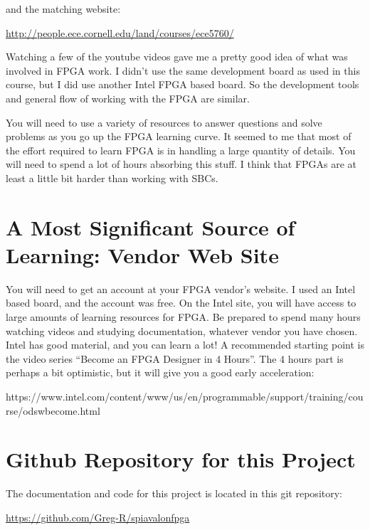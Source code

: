and the matching website:

\url{http://people.ece.cornell.edu/land/courses/ece5760/}

Watching a few of the youtube videos gave me a pretty good idea of what was involved in FPGA work.
I didn't use the same development board as used in this course, but I did use
another Intel FPGA based board.  So the development tools and general flow of working
with the FPGA are similar.

You will need to use a variety of resources to answer questions and solve problems as you go up the FPGA learning curve.
It seemed to me that most of the effort required to learn FPGA is in handling a large quantity of details.
You will need to spend a lot of hours absorbing this stuff.  I think that FPGAs are at least a little bit harder than working with SBCs.

\section{A Most Significant Source of Learning: Vendor Web Site}

You will need to get an account at your FPGA vendor's website.  I used an Intel based board, and the account was free.
On the Intel site, you will have access to large amounts of learning resources for FPGA.
Be prepared to spend many hours watching videos and studying documentation, whatever vendor you have chosen.
Intel has good material, and you can learn a lot!  A recommended starting point is the video series ``Become an FPGA Designer in 4 Hours''.
The 4 hours part is perhaps a bit optimistic, but it will give you a good early acceleration:

https://www.intel.com/content/www/us/en/programmable/support/training/course/odswbecome.html

\section{Github Repository for this Project}

The documentation and code for this project is located in this git repository:

\url{https://github.com/Greg-R/spiavalonfpga}